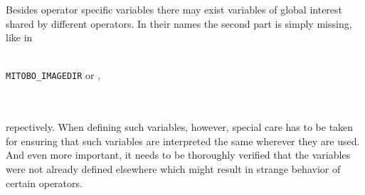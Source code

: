\begin{center}
\end{center}

Besides operator specific variables there may exist variables of global interest shared by different operators. In their
names the second part is simply missing, like in\\\\
\centerline{\texttt{MITOBO\_IMAGEDIR}\hspace*{1cm} or \hspace*{1cm}{\tt mitobo.imagedir},}\\\\
repectively. When defining such variables, however, special care has to be taken for
ensuring that such variables are interpreted the
same wherever they are used. And even more important, it needs to be thoroughly
verified that the variables were not
already defined elsewhere which might result in strange behavior of certain operators.

